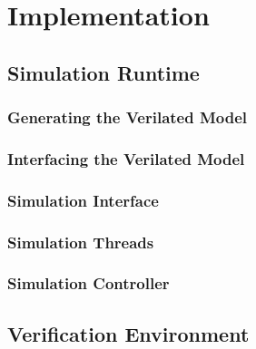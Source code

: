 \documentclass[11pt]{report}
\begin{document}
\chapter{Implementation} %

\section{Simulation Runtime} %

\subsection{Generating the Verilated Model} %

\subsection{Interfacing the Verilated Model} %

\subsection{Simulation Interface} %

\subsection{Simulation Threads} %

\subsection{Simulation Controller} %

\section{Verification Environment} %
\end{document}
